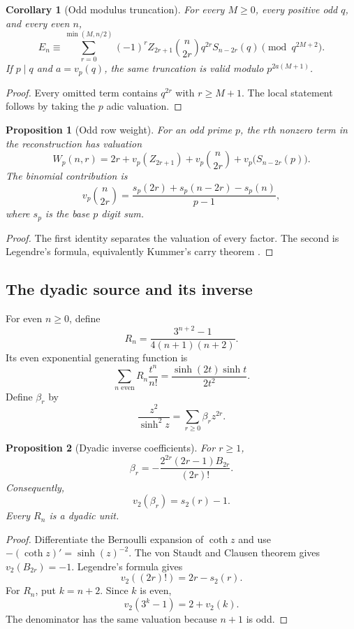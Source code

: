 \documentclass{aomart}
\newtheorem{proposition}[proposition]{Proposition}
\newtheorem{corollary}[corollary]{Corollary}
\theoremstyle{definition}
\theoremstyle{remark}
\newcommand{\vp}{v_p}
\newcommand{\vTwo}{v_2}
\newcommand{\sTwo}{s_2}
\begin{document}
\begin{corollary}[Odd modulus truncation]\label{cor:odd_modulus_truncation}
For every \(M\geq0\), every positive odd \(q\), and every even \(n\),
\[
\boxed{
E_n
\equiv
\sum_{r=0}^{\min(M,n/2)}
(-1)^rZ_{2r+1}
\binom n{2r}q^{2r}S_{n-2r}(q)
\pmod {q^{2M+2}}.
}
\]
If \(p\mid q\) and \(a=\vp(q)\), the same truncation is valid modulo \(p^{2a(M+1)}\).
\end{corollary}

\begin{proof}
Every omitted term contains \(q^{2r}\) with \(r\geq M+1\). The local statement follows by taking the \(p\) adic valuation.
\end{proof}

\begin{proposition}[Odd row weight]\label{prop:odd_row_weight}
For an odd prime \(p\), the \(r\)th nonzero term in the reconstruction has valuation
\[
\boxed{
W_p(n,r)
=
2r+\vp(Z_{2r+1})
+\vp\binom n{2r}
+\vp\bigl(S_{n-2r}(p)\bigr).
}
\]
The binomial contribution is
\[
\boxed{
\vp\binom n{2r}
=
\frac{s_p(2r)+s_p(n-2r)-s_p(n)}{p-1},
}
\]
where \(s_p\) is the base \(p\) digit sum.
\end{proposition}

\begin{proof}
The first identity separates the valuation of every factor. The second is Legendre's formula, equivalently Kummer's carry theorem \cite{IrelandRosen1990}.
\end{proof}

\subsection{The dyadic source and its inverse}

For even \(n\geq0\), define
\[
\boxed{
R_n
=
\frac{3^{n+2}-1}{4(n+1)(n+2)}.
}
\]
Its even exponential generating function is
\[
\boxed{
\sum_{n\text{ even}}R_n\frac{t^n}{n!}
=
\frac{\sinh(2t)\sinh t}{2t^2}.
}
\]
Define \(\beta_r\) by
\[
\boxed{
\frac{z^2}{\sinh^2z}
=
\sum_{r\geq0}\beta_rz^{2r}.
}
\]

\begin{proposition}[Dyadic inverse coefficients]\label{prop:dyadic_beta_unified}
For \(r\geq1\),
\[
\boxed{
\beta_r
=
-
\frac{2^{2r}(2r-1)B_{2r}}{(2r)!}.
}
\]
Consequently,
\[
\boxed{
\vTwo(\beta_r)=\sTwo(r)-1.
}
\]
Every \(R_n\) is a dyadic unit.
\end{proposition}

\begin{proof}
Differentiate the Bernoulli expansion of \(\coth z\) and use \(-(\coth z)'=\sinh(z)^{-2}\). The von Staudt and Clausen theorem gives \(\vTwo(B_{2r})=-1\). Legendre's formula gives
\[
\vTwo((2r)!)=2r-\sTwo(r).
\]
For \(R_n\), put \(k=n+2\). Since \(k\) is even,
\[
\vTwo(3^k-1)=2+\vTwo(k).
\]
The denominator has the same valuation because \(n+1\) is odd.
\end{proof}
\end{document}
